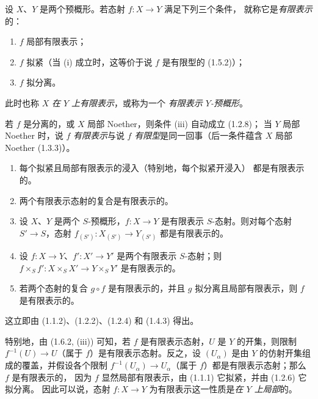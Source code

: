 \begin{definition}[1.6.1]
\label{IV.1.6.1-fr}
设 $X$、$Y$ 是两个预概形。若态射 $f:X\to Y$ 满足下列三个条件，
就称它是\emph{有限表示}的：
\begin{enumerate}
  \item[(i)] $f$ 局部有限表示；
  \item[(ii)] $f$ 拟紧（当 (i) 成立时，这等价于说 $f$ 是有限型的
  (1.5.2)）；
  \item[(iii)] $f$ 拟分离。
\end{enumerate}
此时也称 $X$ \emph{在 $Y$ 上有限表示}，或称为一个
\emph{有限表示 $Y$-预概形}。
\end{definition}

若 $f$ 是分离的，或 $X$ 局部 Noether，则条件 (iii) 自动成立 (1.2.8)；
当 $Y$ 局部 Noether 时，说 $f$ \emph{有限表示}与说 $f$
\emph{有限型}是同一回事（后一条件蕴含 $X$ 局部 Noether (1.3.3)）。


\begin{proposition}[1.6.2]
\label{IV.1.6.2-fr}
\begin{enumerate}
  \item[(i)] 每个拟紧且局部有限表示的浸入（特别地，每个拟紧开浸入）
  都是有限表示的。
  \item[(ii)] 两个有限表示态射的复合是有限表示的。
  \item[(iii)] 设 $X$、$Y$ 是两个 $S$-预概形，$f:X\to Y$ 是有限表示
  $S$-态射。则对每个态射 $S'\to S$，态射
  $f_{(S')}:X_{(S')}\to Y_{(S')}$ 都是有限表示的。
  \item[(iv)] 设 $f:X\to Y$、$f':X'\to Y'$ 是两个有限表示
  $S$-态射；则
  $f\times_Sf':X\times_SX'\to Y\times_SY'$ 是有限表示的。
  \item[(v)] 若两个态射的复合 $g\circ f$ 是有限表示的，并且 $g$
  拟分离且局部有限表示，则 $f$ 是有限表示的。
\end{enumerate}
\end{proposition}

这立即由 (1.1.2)、(1.2.2)、(1.2.4) 和 (1.4.3) 得出。

特别地，由 (1.6.2, (iii)) 可知，若 $f$ 是有限表示态射，$U$ 是 $Y$
的开集，则限制 $f^{-1}(U)\to U$（属于 $f$）是有限表示态射。反之，设
$(U_\alpha)$ 是由 $Y$ 的仿射开集组成的覆盖，并假设各个限制
$f^{-1}(U_\alpha)\to U_\alpha$（属于 $f$）都是有限表示态射；那么 $f$
是有限表示的，
因为 $f$ 显然局部有限表示，由 (1.1.1) 它拟紧，并由 (1.2.6) 它拟分离。
因此可以说，态射 $f:X\to Y$ 为有限表示这一性质是\emph{在 $Y$ 上局部}的。

